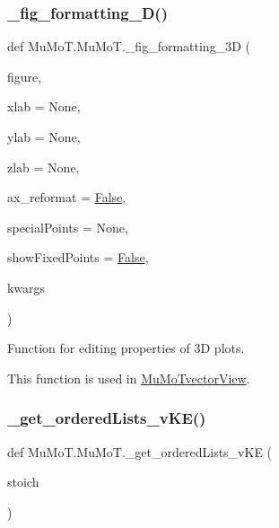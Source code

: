 \subsubsection{\texorpdfstring{\+\_\+fig\+\_\+formatting\+\_\+D()}{\_fig\_formatting\_3D()}}
{\footnotesize\ttfamily def Mu\+Mo\+T.\+Mu\+Mo\+T.\+\_\+fig\+\_\+formatting\+\_\+3D (\begin{DoxyParamCaption}\item[{}]{figure,  }\item[{}]{xlab = {\ttfamily None},  }\item[{}]{ylab = {\ttfamily None},  }\item[{}]{zlab = {\ttfamily None},  }\item[{}]{ax\+\_\+reformat = {\ttfamily \hyperlink{namespace_mu_mo_t_1_1_mu_mo_t_a36cde68b055f3f2ee671020af4ccf4e2}{False}},  }\item[{}]{special\+Points = {\ttfamily None},  }\item[{}]{show\+Fixed\+Points = {\ttfamily \hyperlink{namespace_mu_mo_t_1_1_mu_mo_t_a36cde68b055f3f2ee671020af4ccf4e2}{False}},  }\item[{}]{kwargs }\end{DoxyParamCaption})\hspace{0.3cm}{\ttfamily [private]}}



Function for editing properties of 3D plots. 

This function is used in \hyperlink{class_mu_mo_t_1_1_mu_mo_t_1_1_mu_mo_tvector_view}{Mu\+Mo\+Tvector\+View}. \mbox{\label{namespace_mu_mo_t_1_1_mu_mo_t_aa4d9e72bb9834df8dc09115a251c1973}} 
\subsubsection{\texorpdfstring{\+\_\+get\+\_\+ordered\+Lists\+\_\+v\+K\+E()}{\_get\_orderedLists\_vKE()}}
{\footnotesize\ttfamily def Mu\+Mo\+T.\+Mu\+Mo\+T.\+\_\+get\+\_\+ordered\+Lists\+\_\+v\+KE (\begin{DoxyParamCaption}\item[{}]{stoich }\end{DoxyParamCaption})\hspace{0.3cm}{\ttfamily [private]}}



